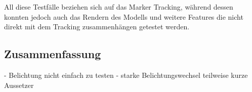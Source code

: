 All diese Testfälle beziehen sich auf das Marker Tracking, während dessen konnten jedoch auch das Rendern des Modells und weitere Features die nicht direkt mit dem Tracking zusammenhängen getestet werden.\\

\subsection{Zusammenfassung}\label{sec:Zusammenfassung}
- Belichtung nicht einfach zu testen
- starke Belichtungswechsel teilweise kurze Aussetzer

